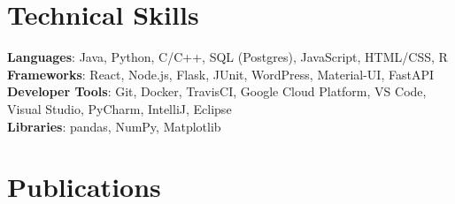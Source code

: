 \documentclass[letterpaper,11pt]{article}
\begin{document}
%
\section{Technical Skills}
 \begin{itemize}[leftmargin=0.15in, label={}]
    \small{\item{
     \textbf{Languages}{: Java, Python, C/C++, SQL (Postgres), JavaScript, HTML/CSS, R} \\
     \textbf{Frameworks}{: React, Node.js, Flask, JUnit, WordPress, Material-UI, FastAPI} \\
     \textbf{Developer Tools}{: Git, Docker, TravisCI, Google Cloud Platform, VS Code, Visual Studio, PyCharm, IntelliJ, Eclipse} \\
     \textbf{Libraries}{: pandas, NumPy, Matplotlib}
    }}
 \end{itemize}

\section{Publications}

\end{document}
